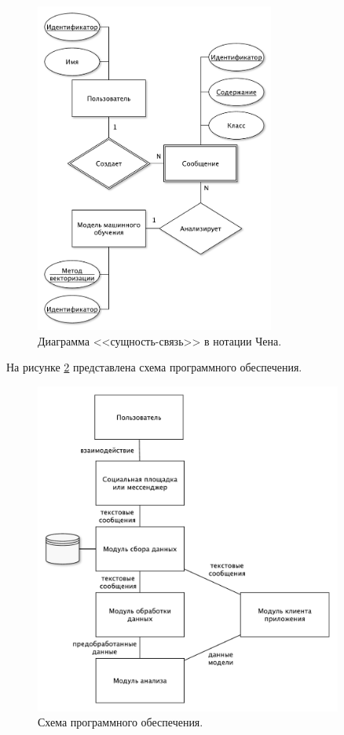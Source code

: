 \begin{figure}[H]
	\centering
	\includegraphics[width=0.7\textwidth]{inc/er.pdf}
	\caption{ Диаграмма <<сущность-связь>> в нотации Чена. }
	\label{img:er}
\end{figure}

На рисунке \ref{img:softScheme} представлена схема программного обеспечения.

\begin{figure}[H]
	\centering
	\includegraphics[width=0.9\textwidth]{inc/softScheme.pdf}
	\caption{ Схема программного обеспечения. }
	\label{img:softScheme}
\end{figure}


